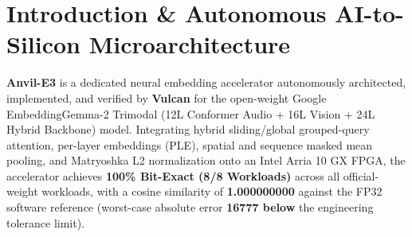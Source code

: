 \documentclass[11pt,a4paper]{article}
\begin{document}
\section{Introduction \& Autonomous AI-to-Silicon Microarchitecture}

\textbf{Anvil-E3} is a dedicated neural embedding accelerator autonomously architected, implemented, and verified by \textbf{Vulcan} for the open-weight Google EmbeddingGemma-2 Trimodal (\allowbreak{}12L Conformer Audio +\allowbreak{} 16L Vision +\allowbreak{} 24L Hybrid Backbone)\allowbreak{} model. Integrating hybrid sliding/global grouped-query attention, per-layer embeddings (PLE), spatial and sequence masked mean pooling, and Matryoshka L2 normalization onto an Intel Arria 10 GX FPGA, the accelerator achieves \textbf{100\% Bit-Exact (\allowbreak{}8/\allowbreak{}8 Workloads)\allowbreak{}} across all official-weight workloads, with a cosine similarity of \textbf{1.000000000} against the FP32 software reference (worst-case absolute error \textbf{16777\texttimes{} below} the engineering tolerance limit).

\vspace{2pt}
\end{document}
